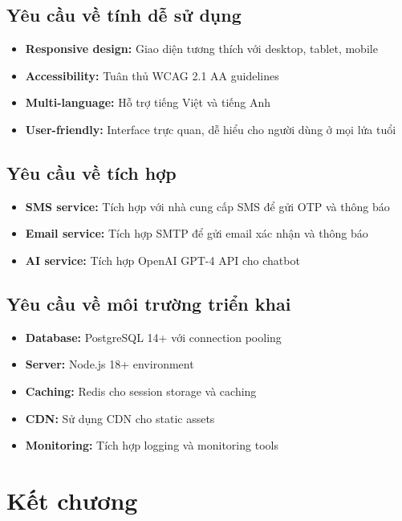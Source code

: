 \documentclass[../DoAn.tex]{subfiles}
\begin{document}
\subsection{Yêu cầu về tính dễ sử dụng}
\begin{itemize}
    \item \textbf{Responsive design:} Giao diện tương thích với desktop, tablet, mobile
    \item \textbf{Accessibility:} Tuân thủ WCAG 2.1 AA guidelines
    \item \textbf{Multi-language:} Hỗ trợ tiếng Việt và tiếng Anh
    \item \textbf{User-friendly:} Interface trực quan, dễ hiểu cho người dùng ở mọi lứa tuổi
\end{itemize}

\subsection{Yêu cầu về tích hợp}
\begin{itemize}
    \item \textbf{SMS service:} Tích hợp với nhà cung cấp SMS để gửi OTP và thông báo
    \item \textbf{Email service:} Tích hợp SMTP để gửi email xác nhận và thông báo
    \item \textbf{AI service:} Tích hợp OpenAI GPT-4 API cho chatbot
\end{itemize}

\subsection{Yêu cầu về môi trường triển khai}
\begin{itemize}
    \item \textbf{Database:} PostgreSQL 14+ với connection pooling
    \item \textbf{Server:} Node.js 18+ environment
    \item \textbf{Caching:} Redis cho session storage và caching
    \item \textbf{CDN:} Sử dụng CDN cho static assets
    \item \textbf{Monitoring:} Tích hợp logging và monitoring tools
\end{itemize}

\section*{Kết chương}
\end{document}
